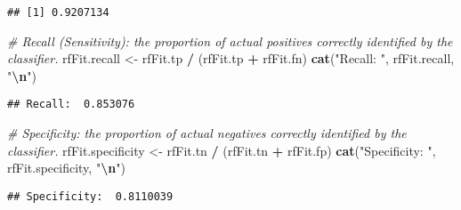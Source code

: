 \documentclass[
]{article}
\newenvironment{Shaded}{\begin{snugshade}}{\end{snugshade}}
\newcommand{\CommentTok}[1]{\textcolor[rgb]{0.56,0.35,0.01}{\textit{#1}}}
\newcommand{\FunctionTok}[1]{\textcolor[rgb]{0.13,0.29,0.53}{\textbf{#1}}}
\newcommand{\NormalTok}[1]{#1}
\newcommand{\OtherTok}[1]{\textcolor[rgb]{0.56,0.35,0.01}{#1}}
\newcommand{\SpecialCharTok}[1]{\textcolor[rgb]{0.81,0.36,0.00}{\textbf{#1}}}
\newcommand{\StringTok}[1]{\textcolor[rgb]{0.31,0.60,0.02}{#1}}
\begin{document}
\begin{verbatim}
## [1] 0.9207134
\end{verbatim}

\begin{Shaded}
\begin{Highlighting}[]
\CommentTok{\# Recall (Sensitivity): the proportion of actual positives correctly identified by the classifier.}
\NormalTok{rfFit.recall }\OtherTok{\textless{}{-}}\NormalTok{ rfFit.tp }\SpecialCharTok{/}\NormalTok{ (rfFit.tp }\SpecialCharTok{+}\NormalTok{ rfFit.fn)}
\FunctionTok{cat}\NormalTok{(}\StringTok{"Recall: "}\NormalTok{, rfFit.recall, }\StringTok{"}\SpecialCharTok{\textbackslash{}n}\StringTok{"}\NormalTok{)}
\end{Highlighting}
\end{Shaded}

\begin{verbatim}
## Recall:  0.853076
\end{verbatim}

\begin{Shaded}
\begin{Highlighting}[]
\CommentTok{\# Specificity: the proportion of actual negatives correctly identified by the classifier.}
\NormalTok{rfFit.specificity }\OtherTok{\textless{}{-}}\NormalTok{ rfFit.tn }\SpecialCharTok{/}\NormalTok{ (rfFit.tn }\SpecialCharTok{+}\NormalTok{ rfFit.fp)}
\FunctionTok{cat}\NormalTok{(}\StringTok{"Specificity: "}\NormalTok{, rfFit.specificity, }\StringTok{"}\SpecialCharTok{\textbackslash{}n}\StringTok{"}\NormalTok{)}
\end{Highlighting}
\end{Shaded}

\begin{verbatim}
## Specificity:  0.8110039
\end{verbatim}
\end{document}
